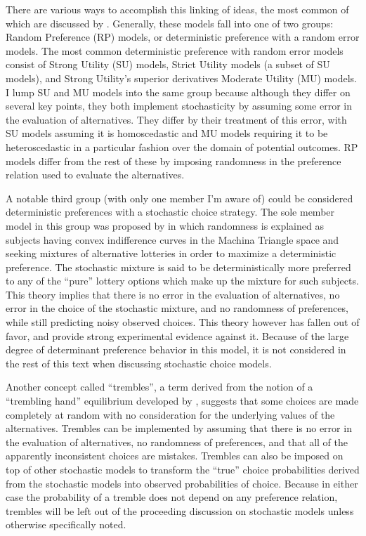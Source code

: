 \documentclass[11pt,a4paper]{report}
\begin{document}
There are various ways to accomplish this linking of ideas, the most common of which are discussed by \textcite{Wilcox2008}.
Generally, these models fall into one of two groups: Random Preference (RP) models, or deterministic preference with a random error models.
The most common deterministic preference with random error models consist of Strong Utility (SU) models, Strict Utility models (a subset of SU models), and Strong Utility's superior derivatives Moderate Utility (MU) models.
I lump SU and MU models into the same group because although they differ on several key points, they both implement stochasticity by assuming some error in the evaluation of alternatives.
They differ by their treatment of this error, with SU models assuming it is homoscedastic and MU models requiring it to be heteroscedastic in a particular fashion over the domain of potential outcomes.
RP models differ from the rest of these by imposing randomness in the preference relation used to evaluate the alternatives.

A notable third group (with only one member I'm aware of) could be considered deterministic preferences with a stochastic choice strategy.
The sole member model in this group was proposed by \textcite{Machina1985} in which randomness is explained as subjects having convex indifference curves in the Machina Triangle space \textcite{Machina1987} and seeking mixtures of alternative lotteries in order to maximize a deterministic preference.
The stochastic mixture is said to be deterministically more preferred to any of the \enquote{pure} lottery options which make up the mixture for such subjects.
This theory implies that there is no error in the evaluation of alternatives, no error in the choice of the stochastic mixture, and no randomness of preferences, while still predicting noisy observed choices.
This theory however has fallen out of favor, and \textcite{Hey1995} provide strong experimental evidence against it.
Because of the large degree of determinant preference behavior in this model, it is not considered in the rest of this text when discussing stochastic choice models.

Another concept called \enquote{trembles}, a term derived from the notion of a \enquote{trembling hand} equilibrium developed by \textcite{Selten1975}, suggests that some choices are made completely at random with no consideration for the underlying values of the alternatives.
Trembles can be implemented by assuming that there is no error in the evaluation of alternatives, no randomness of preferences, and that all of the apparently inconsistent choices are mistakes.
Trembles can also be imposed on top of other stochastic models to transform the \enquote{true} choice probabilities derived from the stochastic models into observed probabilities of choice.
Because in either case the probability of a tremble does not depend on any preference relation, trembles will be left out of the proceeding discussion on stochastic models unless otherwise specifically noted.
\end{document}

